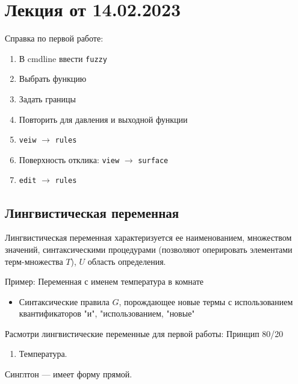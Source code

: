 
\section{Лекция от 14.02.2023}
Справка по первой работе:
\begin{enumerate}
  \item В cmdline ввести \verb!fuzzy!
  \item Выбрать функцию
  \item Задать границы
  \item Повторить для давления и выходной функции
  \item \verb!veiw! $\to$ \verb!rules!
  \item Поверхность отклика: \verb!view! $\to$ \verb!surface!
  \item \verb!edit! $\to$ \verb!rules!
\end{enumerate}

\subsection{Лингвистическая переменная}
Лингвистическая переменная характеризуется ее наименованием, множеством
значений, синтаксическими процедурами (позволяют оперировать элементами
терм-множества $T$), $U$  область определения.

Пример:
Переменная с именем температура в комнате

\begin{itemize}
  \item Синтаксические правила $G$, порождающее новые термы с использованием
    квантификаторов "и", "использованием, "новые"
\end{itemize}

Расмотри лингвистические переменные для первой работы:
{\ttfamily Принцип 80/20}
\begin{enumerate}
  \item Температура.
\end{enumerate}

Синглтон --- имеет форму прямой.
